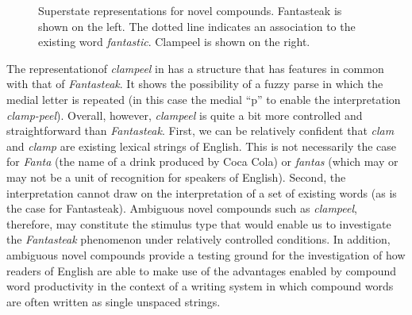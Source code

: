 \documentclass[output=paper]{langsci/langscibook}
\begin{document}
\begin{figure} 
    \centering
    \begin{minipage}{.5\linewidth}%
    \end{minipage}\begin{minipage}{.5\linewidth}%
    \end{minipage}
\caption{\label{fig:libben:3}Superstate representations for novel compounds. Fantasteak is shown on the left.  The dotted line indicates an association to the existing word \textit{fantastic}.  Clampeel is shown on the right.}
\end{figure}

The representation\largerpage[-1] of \textit{clampeel} in  has a structure that has features in common with that of \textit{Fantasteak}.  It shows the possibility of a fuzzy parse in which the medial letter is repeated (in this case the medial “p” to enable the interpretation \textit{clamp-peel}).  Overall, however, \textit{clampeel} is quite a bit more controlled and straightforward than \textit{Fantasteak}. First, we can be relatively confident that \textit{clam} and \textit{clamp} are existing lexical strings of English. This is not necessarily the case for \textit{Fanta} (the name of a drink produced by Coca Cola) or \textit{fantas} (which may or may not be a unit of recognition for speakers of English). Second, the interpretation cannot draw on the interpretation of a set of existing words (as is the case for Fantasteak).  Ambiguous novel compounds such as \textit{clampeel}, therefore, may constitute the stimulus type that would enable us to investigate the \textit{Fantasteak} phenomenon under relatively controlled conditions. In addition, ambiguous novel compounds provide a testing ground for the investigation of how readers of English are able to make use of the advantages enabled by compound word productivity in the context of a writing system in which compound words are often written as single unspaced strings. 
\end{document}
